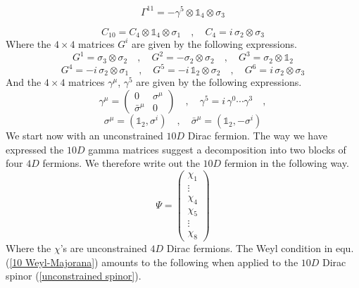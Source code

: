 %
%
\begin{equation}
\Gamma^{11} = -\gamma^5 \otimes \mathbb{1}_4 \otimes \sigma_3
\end{equation}
%
%

%
%
\begin{equation}
C_{10} = C_4 \otimes \mathbb{1}_4 \otimes \sigma_1
%
\quad , \quad
%
C_4 = i \, \sigma_2 \otimes \sigma_3
\end{equation}
%
%
Where the $4 \times 4$ matrices $G^i$ are given by the following expressions.
%
%
\begin{equation*}
G^1 = \sigma_3 \otimes \sigma_2
%
\quad , \quad
%
G^2 = -\sigma_2 \otimes \sigma_2 
%
\quad , \quad
%
G^3 = \sigma_2 \otimes \mathbb{1}_2
\end{equation*}
%
%
\begin{equation}
G^4 = -i \, \sigma_2 \otimes \sigma_1
%
\quad , \quad
%
G^5 = -i \, \mathbb{1}_2 \otimes \sigma_2
%
\quad , \quad
%
G^6 = i \, \sigma_2 \otimes \sigma_3
\end{equation}
%
%
And the $4 \times 4$ matrices $\gamma^\mu$, $\gamma^5$ are given by the following expressions.
%
%
\begin{equation*}
\gamma^\mu = \left( \begin{array}{cc}
0 & \sigma^\mu \\
\bar{\sigma}^\mu & 0
\end{array} \right)
%
\quad , \quad
%
\gamma^5 = i \, \gamma^0 \cdots \gamma^3
%
\quad ,
\end{equation*}
%
%
\begin{equation}
\sigma^\mu = (\mathbb{1}_2, \sigma^i)
%
\quad , \quad
%
\bar{\sigma}^\mu = (\mathbb{1}_2, -\sigma^i)
\end{equation}
%
%
We start now with an unconstrained $10D$ Dirac fermion. The way we have expressed the $10D$ gamma matrices suggest a decomposition into two blocks of four $4D$ fermions. We therefore write out the $10D$ fermion in the following way.
%
%
\begin{equation}\label{unconstrained spinor}
\Psi = \left( \begin{array}{c}
\chi_1 \\
\vdots \\
\chi_4 \\
\chi_5 \\
\vdots \\
\chi_8
\end{array} \right)
\end{equation}
%
%
Where the $\chi$'s are unconstrained $4D$ Dirac fermions. The Weyl condition in equ. (\ref{10 Weyl-Majorana}) amounts to the following when applied to the $10D$ Dirac spinor (\ref{unconstrained spinor}).

